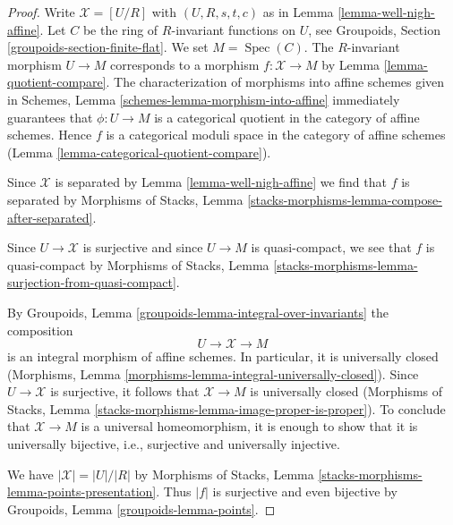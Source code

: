 \documentclass[10pt,a4paper]{amsart}
\theoremstyle{plain}
\theoremstyle{definition}
\theoremstyle{remark}
\numberwithin{equation}{subsection}
\def\Spec{\mathop{\mathrm{Spec}}}
\begin{document}
\begin{proof}
Write $\mathcal{X} = [U/R]$ with $(U, R, s, t, c)$ as in
Lemma \ref{lemma-well-nigh-affine}. Let $C$ be the ring of
$R$-invariant functions on $U$, see
Groupoids, Section \ref{groupoids-section-finite-flat}.
We set $M = \Spec(C)$. The $R$-invariant morphism
$U \to M$ corresponds to a morphism $f : \mathcal{X} \to M$ by
Lemma \ref{lemma-quotient-compare}.
The characterization of morphisms into affine schemes given in
Schemes, Lemma \ref{schemes-lemma-morphism-into-affine}
immediately guarantees that $\phi : U \to M$ is a categorical
quotient in the category of affine schemes. Hence $f$ is a
categorical moduli space in the category of affine schemes
(Lemma \ref{lemma-categorical-quotient-compare}).

\medskip\noindent
Since $\mathcal{X}$ is separated by Lemma \ref{lemma-well-nigh-affine}
we find that $f$ is separated by Morphisms of Stacks, Lemma
\ref{stacks-morphisms-lemma-compose-after-separated}.

\medskip\noindent
Since $U \to \mathcal{X}$ is surjective and since $U \to M$ is quasi-compact,
we see that $f$ is quasi-compact by Morphisms of Stacks, Lemma
\ref{stacks-morphisms-lemma-surjection-from-quasi-compact}.

\medskip\noindent
By Groupoids, Lemma \ref{groupoids-lemma-integral-over-invariants}
the composition
$$
U \to \mathcal{X} \to M
$$
is an integral morphism of affine schemes. In particular, it is
universally closed
(Morphisms, Lemma \ref{morphisms-lemma-integral-universally-closed}).
Since $U \to \mathcal{X}$ is surjective, it follows that $\mathcal{X} \to M$
is universally closed (Morphisms of Stacks, Lemma
\ref{stacks-morphisms-lemma-image-proper-is-proper}).
To conclude that $\mathcal{X} \to M$ is a universal homeomorphism,
it is enough to show that it is universally bijective, i.e.,
surjective and universally injective.

\medskip\noindent
We have $|\mathcal{X}| = |U|/|R|$ by
Morphisms of Stacks, Lemma \ref{stacks-morphisms-lemma-points-presentation}.
Thus $|f|$ is surjective and even bijective
by Groupoids, Lemma \ref{groupoids-lemma-points}.


\end{proof}
\end{document}
